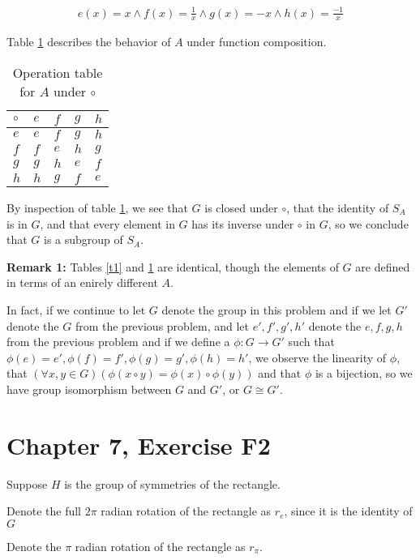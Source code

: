 \documentclass[12pt]{article}
\begin{document}
\begin{align}
	e(x) =  x \land
	f(x) = \frac{1}{x} \land
	g(x) = -x \land
	h(x) = \frac{-1}{x}
\end{align}

Table \ref{t2} describes the behavior of $A$
under function composition.

\begin{table}[!ht] 
\begin{tabular}{l|llll}
	$\circ$ & $e$ & $f$ & $g$ & $h$ \\ \hline
	$e$ & $e$ & $f$ & $g$ & $h$ \\
	$f$ & $f$ & $e$ & $h$ & $g$ \\
	$g$ & $g$ & $h$ & $e$ & $f$ \\
	$h$ & $h$ & $g$ & $f$ & $e$ \\
\end{tabular}
\centering
\caption{Operation table for $A$ under $\circ$}
\label{t2}
\end{table}

By inspection of table \ref{t2},
we see that $G$ is closed under $\circ$,
that the identity of $S_A$ is in $G$,
and that every element in $G$
has its inverse under $\circ$ in $G$,
so we conclude that $G$ is a subgroup of $S_A$.

\textbf{Remark 1:}
Tables \ref{t1} and \ref{t2} are identical,
though the elements of $G$
are defined in terms
of an enirely different $A$.

In fact,
if we continue to let $G$ denote
the group in this problem
and if we let $G'$ denote
the $G$ from the previous problem,
and let $e', f', g', h'$ denote the $e,f,g,h$ from the previous problem
and if we define a $\phi:G \to G'$
such that $\phi(e) = e', \phi(f) = f', \phi(g) = g', \phi(h) = h'$,
we observe the linearity of $\phi$,
that $(\forall x,y \in G)(\phi(x \circ y) = \phi(x) \circ \phi(y))$
and that $\phi$ is a bijection,
so we have group isomorphism between $G$ and $G'$,
or $G \cong G'$.

\section{Chapter 7, Exercise F2}

Suppose $H$ is the group of symmetries of the rectangle.

Denote the full $2\pi$ radian rotation
of the rectangle
as $r_e$,
since it is the identity of $G$

Denote the $\pi$ radian rotation
of the rectangle
as $r_\pi$.
\end{document}
